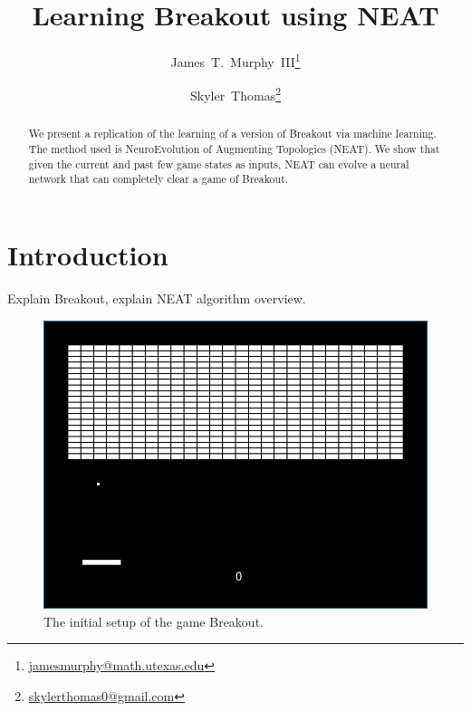 \documentclass[letterpaper, twocolumn, conference]{article}
\author{James~T.~Murphy~III\thanks{\url{jamesmurphy@math.utexas.edu}}\and{}Skyler~Thomas\thanks{\url{skylerthomas0@gmail.com}}}
\title{Learning Breakout using NEAT}
\begin{document}
\maketitle{}
\begin{abstract}
    We present a replication of the learning of a version of 
    Breakout via machine learning.
    The method used is NeuroEvolution of Augmenting Topologies (NEAT).
    We show that given the current and past few game states as inputs, NEAT
    can evolve a neural network that can completely clear a game of Breakout.
\end{abstract}

\section{Introduction}

Explain Breakout, explain NEAT algorithm overview.

\begin{figure}[h!]
    \centering
    \includegraphics[width=.45\textwidth]{breakout.png}
    \caption{The initial setup of the game Breakout.}
\end{figure}
\end{document}
